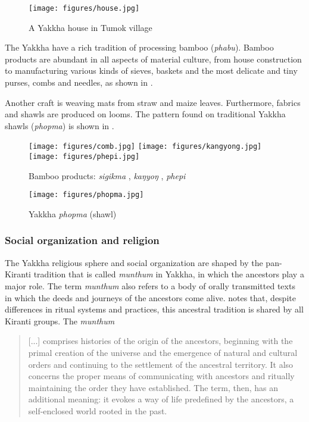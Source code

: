 \begin{figure}[t]
\centering
\texttt{[image: figures/house.jpg]}
\caption{A Yakkha house in Tumok village}\label{house}
\end{figure}


The Yakkha have a rich tradition of processing bamboo (\emph{phabu}). Bamboo products are abundant in all aspects  of material culture, from house construction to manufacturing various kinds of sieves, baskets and the most delicate and tiny purses, combs and needles, as shown in .

Another craft is weaving mats from straw and maize leaves. Furthermore, fabrics and shawls are produced on looms.  The pattern found on traditional Yakkha shawls (\emph{phopma}) is shown in . 


 \begin{figure}[t]
 \texttt{[image: figures/comb.jpg]}
 \hfill
 \texttt{[image: figures/kangyong.jpg]}
 \hfill
 \texttt{[image: figures/phepi.jpg]}
 \caption{Bamboo  products: \emph{sigikma} , \emph{kaŋyoŋ} , \emph{phepi} }\label{phabu}
 \end{figure}



\begin{figure}[t]
\centering
\texttt{[image: figures/phopma.jpg]}
\caption{Yakkha \emph{phopma} (shawl)}\label{phopma}
\end{figure}

\subsubsection{Social organization and religion}\label{social}

The Yakkha religious sphere and social organization are shaped by the pan-Ki\-ran\-ti tradition that is called \emph{munthum} in Yakkha, in which the ancestors play a major role. The term \emph{munthum} also refers to a body of orally transmitted texts in which the deeds and journeys of the ancestors come alive. \citet{Gaenszle_Redefining} notes that, despite differences in ritual systems and practices, this ancestral tradition is shared by  all Kiranti groups. The \emph{munthum}

\begin{quote}
[...] comprises histories of the origin of the ancestors, beginning with the primal creation of the universe and the emergence of natural and cultural orders and continuing to the settlement of the ancestral territory. It also concerns the proper means of communicating with ancestors and ritually maintaining the order they have established. The term, then, has an additional meaning: it evokes a way of life predefined by the ancestors, a self-enclosed world rooted in the past. \citep[224]{Gaenszle2000Origins}
\end{quote}

